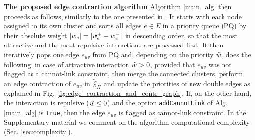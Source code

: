 \textbf{The proposed edge contraction algorithm } Algorithm \ref{main_alg} then proceeds as follows, similarly to the one presented in \cite{levinkov2017comparative}. It starts with each node assigned to its own cluster and sorts all edges $e\in E$ in a priority queue (PQ) by their absolute weight $|w_e|=|w_e^+ - w_e^-|$ in descending order, so that the most attractive and the most repulsive interactions are processed first. It then iteratively pops one edge $e_{uv}$ from PQ and, depending on the priority $\tilde{w}$, does the following: in case of attractive interaction $\tilde{w}>0$, provided that $e_{uv}$ was not flagged as a cannot-link constraint, then merge the connected clusters, perform an edge contraction of $e_{uv}$ in $\tilde{\mathcal{G}}_\Pi$ and update the priorities of new double edges as explained in Fig. \ref{fig:edge_contraction_and_contr_graph}. 
If, on the other hand, the interaction is repulsive ($\tilde{w}\leq 0$) and the option \texttt{addCannotLink} of Alg. \ref{main_alg} is \texttt{True}, then the edge $e_{uv}$ is flagged as cannot-link constraint.
In the Supplementary material we comment on the algorithm computational complexity (Sec. \ref{sec:complexity}).

